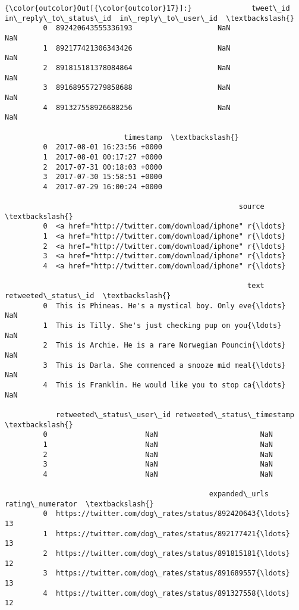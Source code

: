 \documentclass[11pt]{article}
\begin{document}
\begin{Verbatim}[commandchars=\\\{\}]
{\color{outcolor}Out[{\color{outcolor}17}]:}              tweet\_id  in\_reply\_to\_status\_id  in\_reply\_to\_user\_id  \textbackslash{}
         0  892420643555336193                    NaN                  NaN   
         1  892177421306343426                    NaN                  NaN   
         2  891815181378084864                    NaN                  NaN   
         3  891689557279858688                    NaN                  NaN   
         4  891327558926688256                    NaN                  NaN   
         
                            timestamp  \textbackslash{}
         0  2017-08-01 16:23:56 +0000   
         1  2017-08-01 00:17:27 +0000   
         2  2017-07-31 00:18:03 +0000   
         3  2017-07-30 15:58:51 +0000   
         4  2017-07-29 16:00:24 +0000   
         
                                                       source  \textbackslash{}
         0  <a href="http://twitter.com/download/iphone" r{\ldots}   
         1  <a href="http://twitter.com/download/iphone" r{\ldots}   
         2  <a href="http://twitter.com/download/iphone" r{\ldots}   
         3  <a href="http://twitter.com/download/iphone" r{\ldots}   
         4  <a href="http://twitter.com/download/iphone" r{\ldots}   
         
                                                         text  retweeted\_status\_id  \textbackslash{}
         0  This is Phineas. He's a mystical boy. Only eve{\ldots}                  NaN   
         1  This is Tilly. She's just checking pup on you{\ldots}                  NaN   
         2  This is Archie. He is a rare Norwegian Pouncin{\ldots}                  NaN   
         3  This is Darla. She commenced a snooze mid meal{\ldots}                  NaN   
         4  This is Franklin. He would like you to stop ca{\ldots}                  NaN   
         
            retweeted\_status\_user\_id retweeted\_status\_timestamp  \textbackslash{}
         0                       NaN                        NaN   
         1                       NaN                        NaN   
         2                       NaN                        NaN   
         3                       NaN                        NaN   
         4                       NaN                        NaN   
         
                                                expanded\_urls  rating\_numerator  \textbackslash{}
         0  https://twitter.com/dog\_rates/status/892420643{\ldots}                13   
         1  https://twitter.com/dog\_rates/status/892177421{\ldots}                13   
         2  https://twitter.com/dog\_rates/status/891815181{\ldots}                12   
         3  https://twitter.com/dog\_rates/status/891689557{\ldots}                13   
         4  https://twitter.com/dog\_rates/status/891327558{\ldots}                12   
         

\end{Verbatim}
\end{document}
